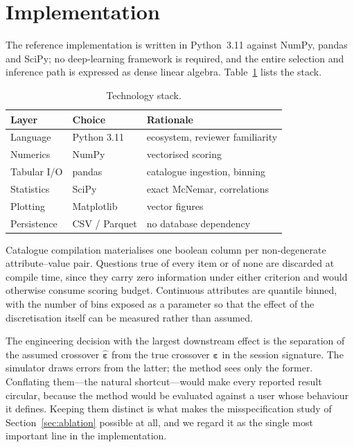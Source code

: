 \documentclass[conference]{IEEEtran}
\begin{document}
\section{Implementation}

The reference implementation is written in Python~3.11 against NumPy, pandas
and SciPy; no deep-learning framework is required, and the entire selection and
inference path is expressed as dense linear algebra.
Table~\ref{tab:stack} lists the stack.

\begin{table}[t]
\caption{Technology stack.}
\label{tab:stack}
\centering
\footnotesize
\begin{tabular}{@{}lll@{}}
\toprule
\textbf{Layer} & \textbf{Choice} & \textbf{Rationale} \\
\midrule
Language & Python 3.11 & ecosystem, reviewer familiarity \\
Numerics & NumPy & vectorised scoring \\
Tabular I/O & pandas & catalogue ingestion, binning \\
Statistics & SciPy & exact McNemar, correlations \\
Plotting & Matplotlib & vector figures \\
Persistence & CSV / Parquet & no database dependency \\
\bottomrule
\end{tabular}
\end{table}

Catalogue compilation materialises one boolean column per non-degenerate
attribute--value pair. Questions true of every item or of none are discarded at
compile time, since they carry zero information under either criterion and
would otherwise consume scoring budget. Continuous attributes are quantile
binned, with the number of bins exposed as a parameter so that the effect of
the discretisation itself can be measured rather than assumed.

The engineering decision with the largest downstream effect is the separation
of the assumed crossover $\hat{\boldsymbol\varepsilon}$ from the true crossover
$\boldsymbol\varepsilon$ in the session signature. The simulator draws errors
from the latter; the method sees only the former. Conflating them---the natural
shortcut---would make every reported result circular, because the method would
be evaluated against a user whose behaviour it defines. Keeping them distinct
is what makes the misspecification study of Section~\ref{sec:ablation} possible
at all, and we regard it as the single most important line in the
implementation.
\end{document}
